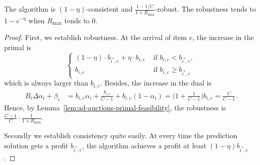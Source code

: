 \begin{theorem}
The algorithm is $(1 - \eta)$-consistent and $\frac{1 - 1/C}{1 + R_{\max}}$-robust.
The robustness tends to $1 - e^{-\eta}$ when $R_{\max}$ tends to 0.
\end{theorem}
%
\begin{proof}
First, we establish robustness. At the arrival of item $e$, the increase in the primal is 
$$
\begin{cases}
	(1-\eta) \cdot b_{i^{*},e} + \eta \cdot b_{i,e} & \text{ if } b_{i,e} < b_{i^{*},e}, \\
	b_{i,e} & \text{ if } b_{i,e} \geq b_{i^{*},e} 
\end{cases}
$$
which is always larger than $b_{i,e}$. Besides, the increase in the dual is 
\begin{align*}
B_{i} \Delta \alpha_{i}  + \beta_{e}
&= b_{i,e} \alpha_{i} + \frac{b_{i,e}}{C-1} 
 + b_{i,e} (1 - \alpha_{i}) 
 = \biggl( 1 + \frac{1}{C-1} \biggr) b_{i,e}
 = \frac{C}{C - 1}.
 \end{align*}
Hence, by Lemma~\ref{lem:ad-auctions-primal-feasibility}, the robustness is 
$\frac{C-1}{C} \cdot \frac{1}{1+R_{\max}}$.

Secondly we establish consistency quite easily. At every time the prediction solution gets a profit $b_{i^{*},e}$, the algorithm achieves a profit 
at least $(1 - \eta) b_{i^{*},e}$.
\end{proof}

